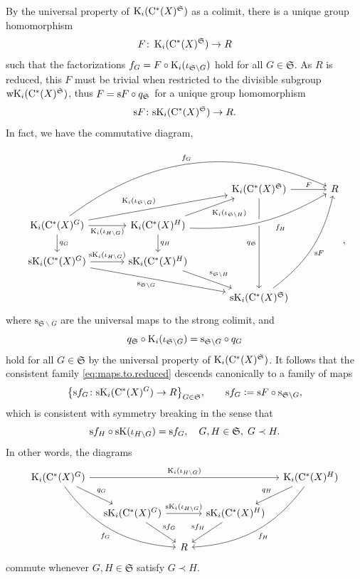 \documentclass{amsart}
\numberwithin{figure}{section}
\numberwithin{equation}{section}
\numberwithin{table}{section}
\theoremstyle{plain}
\theoremstyle{definition}
\theoremstyle{remark}
\theoremstyle{nonumber}
\newcommand{\K}{\relax\ifmmode\operatorname{K}\else\textup{K}\fi}
\newcommand{\Cst}{\relax\ifmmode\mathrm{C}^*\else\textup{C*}\fi}
\newcommand{\defeq}{\mathrel{\vcentcolon=}}
\begin{document}
By the universal property of $\K_i(\Cst(X)^\mathfrak{S})$ as a colimit, 
there is a unique group homomorphism
\[
F\colon \K_i(\Cst(X)^\mathfrak{S})\to R
\]
such that the factorizations $f_G=F\circ \K_i(\iota_{\mathfrak{S}\backslash
G})$ hold for all $G\in\mathfrak{S}$. As $R$ is reduced, this $F$
must be trivial when restricted to the divisible subgroup ${\rm wK}_i(\Cst(X)^\mathfrak{S})$, thus $F={\rm s}F\circ q_\mathfrak{S}$
for a unique group homomorphism
\[
{\rm s}F\colon {\rm sK}_i(\Cst(X)^\mathfrak{S})\to R.
\]
In fact, we have the
commutative diagram,
\begin{equation}\label{eq:weak.strong.colimit.diagram}
\begin{tikzcd}[column sep=1.2cm]
     & & \K_i(\Cst(X)^\mathfrak{S})\ar[ddd,"q_\mathfrak{S}"']\ar[r,"F"] & R\\
    \K_i(\Cst(X)^G)\ar[r,"\K_i(\iota_{H\backslash G})"']\ar[d,"q_G"]\ar[urr,"\K_i(\iota_{\mathfrak{S}\backslash G})"]\ar[urrr,"f_G", bend left=30] & \K_i(\Cst(X)^H)\ar[d,"q_H"]\ar[ur,"\K_i(\iota_{\mathfrak{S}\backslash H})"']\ar[urr,"{\quad\;}f_H"', bend right=16, crossing over] & & \\
    {\rm sK}_i(\Cst(X)^G)\ar[r,"{\rm sK}_i(\iota_{H\backslash G})"]\ar[drr,"\mathrm{s}_{\mathfrak{S}\backslash G}"'] & {\rm sK}_i(\Cst(X)^H)\ar[dr,"\mathrm{s}_{\mathfrak{S}\backslash H}"] & &\\ 
    & & {\rm sK}_i(\Cst(X)^\mathfrak{S})\ar[uuur,"{\rm s}F"', bend right=20] &
\end{tikzcd},
\end{equation}
where $\mathrm{s}_{\mathfrak{S}\backslash G}$ are the universal maps to the strong colimit, and
\[
q_\mathfrak{S}\circ\K_i(\iota_{\mathfrak{S}\backslash G})=\mathrm{s}_{\mathfrak{S}\backslash G}\circ q_G
\]
hold for all $G\in\mathfrak{S}$ by the universal property of $\K_i(\Cst(X)^\mathfrak{S})$.
It follows that the consistent family \eqref{eq:maps.to.reduced} descends canonically to a family of maps
\begin{equation}\label{eq:strong.consistent.family}
\big\{\mathrm{s}f_G\colon {\rm sK}_i(\Cst(X)^G)\to R\big\}_{G\in\mathfrak{S}},\qquad \mathrm{s}f_G \defeq {\rm s}F\circ\mathrm{s}_{\mathfrak{S}\backslash G},
\end{equation}
which is consistent with 
symmetry breaking in the sense that 
\begin{equation}\label{eq:consistent.symm.break.strong}
{\rm s}f_H\circ{\rm sK}(\iota_{H\backslash G})={\rm s}f_G,\quad 
G,H\in\mathfrak{S},\;G\prec H.
\end{equation}
In other words, the diagrams
\[
\begin{tikzcd}[column sep=10]
    \K_i(\Cst(X)^G)\ar[dr,"q_G"]\ar[rrrr,"\K_i(\iota_{H\backslash G})"]\ar[ddrr,"f_G"',bend right=25] & {} & {} & {} & \K_i(\Cst(X)^H)\ar[dl,"q_H"']\ar[ddll,"f_H",bend left=25]\\
    {} & {\rm sK}_i(\Cst(X)^G)\ar[dr,"{\rm s}f_G"]\ar[rr,"{\rm sK}_i(\iota_{H\backslash G})"] & {} & {\rm sK}_i(\Cst(X)^H)\ar[dl,"{\rm s}f_H"'] & {}\\
    {} & {} & R & {} & {}
\end{tikzcd}
\]
commute whenever $G,H\in\mathfrak{S}$ satisfy \( G\prec H \). 
\end{document}
